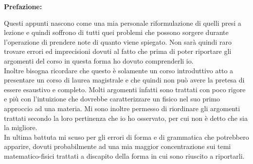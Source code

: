\begin{titlepage}
\begin{center}
	\textbf{Prefazione:}
\end{center}

Questi appunti nascono come una mia personale riformulazione di quelli presi a lezione e quindi soffrono di tutti quei problemi che possono sorgere durante l'operazione di prendere note di quanto viene spiegato. Non sarà quindi raro trovare errori ed imprecisioni dovuti al fatto che prima di poter riportare gli argomenti del corso in questa forma ho dovuto comprenderli io. \\

Inoltre bisogna ricordare che questo è solamente un corso introduttivo atto a presentare un corso di laurea magistrale e che quindi non può avere la pretesa di essere esaustivo e completo. Molti argomenti infatti sono trattati con poco rigore e più con l'intuizione che dovrebbe caratterizzare un fisico nel suo primo approccio ad una materia. Mi sono inoltre permesso di riordinare gli argomenti trattati secondo la loro pertinenza che io ho osservato, per cui non è detto che sia la migliore.\\

In ultima battuta mi scuso per gli errori di forma e di grammatica che potrebbero apparire, dovuti probabilmente ad una mia maggior concentrazione sui temi matematico-fisici trattati a discapito della forma in cui sono riuscito a riportarli. 
\end{titlepage}